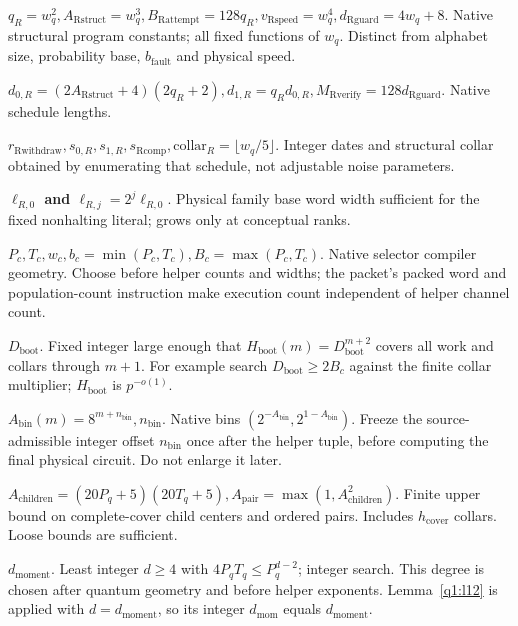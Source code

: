 \noindent\textbf{\(q_{R}=w_{q}^{2},A_{\mathrm{Rstruct}}=w_{q}^{3},B_{\mathrm{Rattempt}}=128q_{R},v_{\mathrm{Rspeed}}=w_{q}^{4},d_{\mathrm{Rguard}}=4w_{q}+8\)}. Native structural program constants; all fixed functions of \(w_{q}\). Distinct from alphabet size, probability base, \(b_{\mathrm{fault}}\) and physical speed.\par\smallskip
\noindent\textbf{\(d_{0,R}=(2A_{\mathrm{Rstruct}}+4)(2q_{R}+2),d_{1,R}=q_{R} d_{0,R},M_{\mathrm{Rverify}}=128d_{\mathrm{Rguard}}\)}. Native schedule lengths.\par\smallskip
\noindent\textbf{\(r_{\mathrm{Rwithdraw}},s_{0,R},s_{1,R},s_{\mathrm{Rcomp}},\mathrm{collar}_{R}=\lfloor w_{q}/5\rfloor\)}. Integer dates and structural collar obtained by enumerating that schedule, not adjustable noise parameters.\par\smallskip
\noindent\textbf{\(\ell_{R,0}\) and \(\ell_{R,j}=2^{j} \ell_{R,0}\)}. Physical family base word width sufficient for the fixed nonhalting literal; grows only at conceptual ranks.\par\smallskip
\noindent\textbf{\(P_{c},T_{c},w_{c},b_{c}=\min (P_{c},T_{c}),B_{c}=\max (P_{c},T_{c})\)}. Native selector compiler geometry. Choose before helper counts and widths; the packet's packed word and population-count instruction make execution count independent of helper channel count.\par\smallskip
\noindent\textbf{\(D_{\mathrm{boot}}\)}. Fixed integer large enough that \(H_{\mathrm{boot}}(m)=D_{\mathrm{boot}}^{m+2}\) covers all work and collars through \(m+1\). For example search \(D_{\mathrm{boot}}\ge 2B_{c}\) against the finite collar multiplier; \(H_{\mathrm{boot}}\) is \(p^{-o(1)}\).\par\smallskip
\noindent\textbf{\(A_{\mathrm{bin}}(m)=8^{m+n_{\mathrm{bin}}}, n_{\mathrm{bin}}\)}. Native bins \((2^{-A_{\mathrm{bin}}},2^{1-A_{\mathrm{bin}}})\). Freeze the source-admissible integer offset \(n_{\mathrm{bin}}\) once after the helper tuple, before computing the final physical circuit. Do not enlarge it later.\par\smallskip
\noindent\textbf{\(A_{\mathrm{children}}=(20P_{q}+5)(20T_{q}+5), A_{\mathrm{pair}}=\max (1,A_{\mathrm{children}}^{2})\)}. Finite upper bound on complete-cover child centers and ordered pairs. Includes \(h_{\mathrm{cover}}\) collars. Loose bounds are sufficient.\par\smallskip
\noindent\textbf{\(d_{\mathrm{moment}}\)}. Least integer \(d\ge 4\) with \(4P_{q} T_{q}\le P_{q}^{d-2}\); integer search. This degree is chosen after quantum geometry and before helper exponents. Lemma~\ref{q1:l12} is applied with \(d=d_{\mathrm{moment}}\), so its integer \(d_{\mathrm{mom}}\) equals \(d_{\mathrm{moment}}\).\par\smallskip
